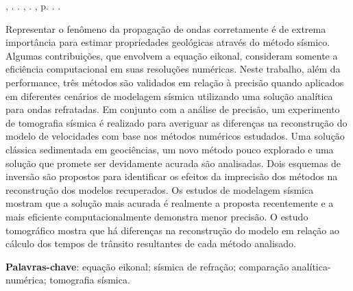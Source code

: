 \setlength{\absparsep}{18pt} %
\begin{resumo}
    \fonteResumo

\begin{flushleft}
\MakeUppercase{\imprimirSobrenome}, \imprimirPrimeirosNomes. \textbf{\imprimirtitulo}. \imprimirtipotrabalho, \imprimirinstituicao. \imprimirlocal,  p. \pageref{LastPage}. \imprimirAnoDeDefesa.
\end{flushleft}

	Representar o fenômeno da propagação de ondas corretamente é de extrema importância para estimar propriedades geológicas através do método sísmico. Algumas contribuições, que envolvem a equação eikonal, consideram somente a eficiência computacional em suas resoluções numéricas. Neste trabalho, além da performance, três métodos são validados em relação à precisão quando aplicados em diferentes cenários de modelagem sísmica utilizando uma solução analítica para ondas refratadas. Em conjunto com a análise de precisão, um experimento de tomografia sísmica é realizado para averiguar as diferenças na reconstrução do modelo de velocidades com base nos métodos numéricos estudados. Uma solução clássica sedimentada em geociências, um novo método pouco explorado e uma solução que promete ser devidamente acurada são analisadas. Dois esquemas de inversão são propostos para identificar os efeitos da imprecisão dos métodos na reconstrução dos modelos recuperados. Os estudos de modelagem sísmica mostram que a solução mais acurada é realmente a proposta recentemente e a mais eficiente computacionalmente demonstra menor precisão. O estudo tomográfico mostra que há diferenças na reconstrução do modelo em relação ao cálculo dos tempos de trânsito resultantes de cada método analisado.     
	
    \textbf{Palavras-chave}: equação eikonal; sísmica de refração; comparação analítica-numérica; tomografia sísmica.
\end{resumo}
